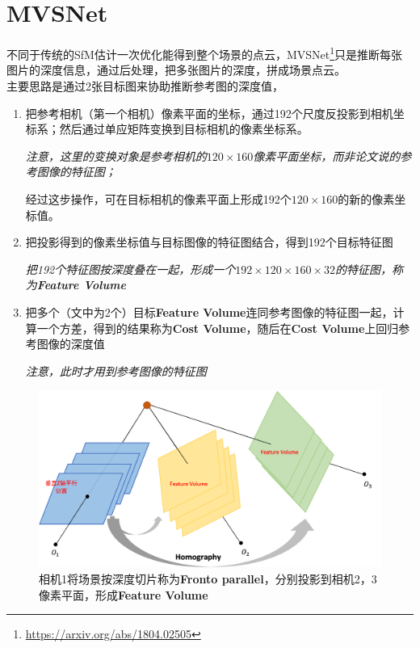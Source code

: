 \section{MVSNet}

	不同于传统的SfM估计一次优化能得到整个场景的点云，MVSNet\footnote{\url{https://arxiv.org/abs/1804.02505}}只是推断每张图片的深度信息，通过后处理，把多张图片的深度，拼成场景点云。\\

	主要思路是通过2张目标图来协助推断参考图的深度值，

	\begin{enumerate}
		\item 把参考相机（第一个相机）像素平面的坐标，通过192个尺度反投影到相机坐标系；然后通过单应矩阵变换到目标相机的像素坐标系。

		\small\textit{ 注意，这里的变换对象是参考相机的$120 \times 160$像素平面坐标，而非论文说的参考图像的特征图；}

		经过这步操作，可在目标相机的像素平面上形成192个$120 \times 160$的新的像素坐标值。

		\item 把投影得到的像素坐标值与目标图像的特征图结合，得到192个目标特征图

		\small\textit{把192个特征图按深度叠在一起，形成一个$192 \times 120 \times 160 \times 32$的特征图，称为\textbf{Feature Volume}}

		\item 把多个（文中为2个）目标\textbf{Feature Volume}连同参考图像的特征图一起，计算一个方差，得到的结果称为\textbf{Cost Volume}，随后在\textbf{Cost Volume}上回归参考图像的深度值

		\small\textit{注意，此时才用到参考图像的特征图}
	\end{enumerate}

	\begin{figure}[H]
		\begin{center}
			\includegraphics[width=\textwidth]{../images/fronto.png}
		\end{center}
		\caption{相机1将场景按深度切片称为\textbf{Fronto parallel}，分别投影到相机2，3像素平面，形成\textbf{Feature Volume}}
	\end{figure}

